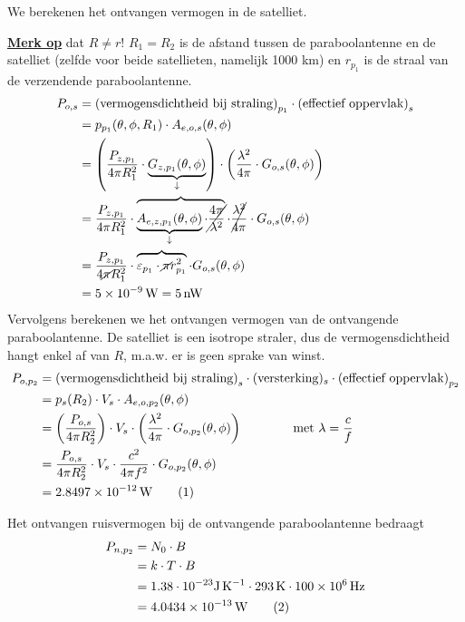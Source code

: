 \documentclass[kulak]{kulakarticle}
\newcommand\numberthis{\addtocounter{equation}{1}\tag{\theequation}}
\begin{document}
	We berekenen het ontvangen vermogen in de satelliet.

	\underline{\textbf{Merk op}} dat \(R\neq r\)! \(R_1=R_2\) is de afstand tussen de paraboolantenne en de satelliet (zelfde voor beide satellieten, namelijk 1000 km) en \(r_{p_1}\) is de straal van de verzendende paraboolantenne.
	\begin{align*}
		P_{o,s} &= \text{(vermogensdichtheid bij straling)}_{p_1} \cdot \text{(effectief oppervlak)}_s \\
		&= p_{p_1}(\theta,\phi,R_1) \cdot A_{e,o,s}(\theta, \phi)\\
		&= \left(\frac{P_{z,p_1}}{4\pi R_1^2}\cdot \underbrace{G_{z,p_1}(\theta,\phi)}_\downarrow \right)\cdot \left(\frac{\lambda^2}{4\pi}\cdot G_{o,s}(\theta, \phi)\right) \\
		&= \frac{P_{z,p_1}}{4\pi R_1^2}\cdot \overbrace{ \underbrace{A_{e,z,p_1}(\theta,\phi)}_\downarrow\cdot \cancel{\frac{4 \pi}{\lambda^2}} } \cdot \cancel{\frac{\lambda^2}{4\pi}}\cdot G_{o,s}(\theta, \phi) \\
		&= \frac{P_{z,p_1}}{4\cancel{\pi} R_1^2}\cdot \overbrace{ \varepsilon_{p_1} \cdot \cancel{\pi} r_{p_1}^2 } \cdot G_{o,s}(\theta, \phi) \\
		&= \SI{5e-9}{\watt} = \SI{5}{\nano\watt}
	\end{align*}
	Vervolgens berekenen we het ontvangen vermogen van de ontvangende paraboolantenne. De satelliet is een isotrope straler, dus de vermogensdichtheid hangt enkel af van \(R\), m.a.w. er is geen sprake van winst.
	\begin{align*}
		P_{o,p_2} &= \text{(vermogensdichtheid bij straling)}_s \cdot (\text{versterking})_s \cdot \text{(effectief oppervlak)}_{p_2} \\
		&= p_{s}(R_2) \cdot V_s \cdot A_{e,o,p_2}(\theta, \phi)\\
		&= \left(\frac{P_{o,s}}{4\pi R_2^2} \right) \cdot V_s \cdot \left(\frac{\lambda^2}{4\pi}\cdot G_{o,p_2}(\theta, \phi)\right) \qquad \qquad \text{met } \lambda = \frac{c}{f} \\
		&= \frac{P_{o,s}}{4\pi R_2^2} \cdot V_s \cdot \frac{c^2}{4\pi f^2}\cdot G_{o,p_2}(\theta, \phi) \\
		&= \SI{2.8497e-12}{\watt} \numberthis \label{ontvangen_vermogen}
	\end{align*}

	Het ontvangen ruisvermogen bij de ontvangende paraboolantenne bedraagt
	\begin{align*}
		P_{n,p_2} &= N_0 \cdot B \\
		&= k \cdot T \cdot B \\
		&= 1.38 \cdot 10^{-23} \unit{\joule\per\kelvin} \cdot \SI{293}{K} \cdot \SI{100e6}{\hertz}\\
		&= \SI{4.0434e-13}{W} \numberthis \label{ruisvermogen}
	\end{align*}
\end{document}
